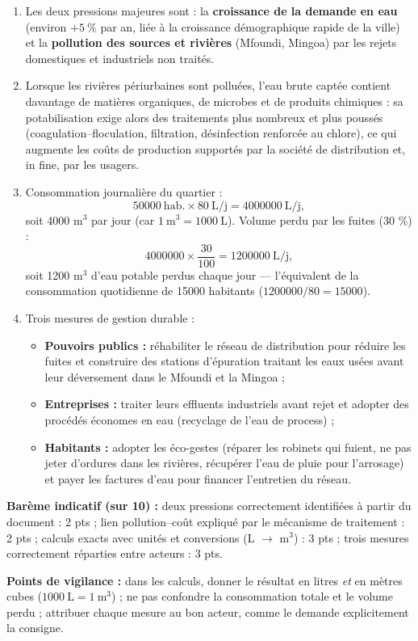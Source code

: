 \documentclass[11pt]{article}
\begin{document}
\begin{corrige}
\begin{enumerate}
\item Les deux pressions majeures sont : la \textbf{croissance de la demande en eau} (environ $+5\ \%$ par an, liée à la croissance démographique rapide de la ville) et la \textbf{pollution des sources et rivières} (Mfoundi, Mingoa) par les rejets domestiques et industriels non traités.
\item Lorsque les rivières périurbaines sont polluées, l'eau brute captée contient davantage de matières organiques, de microbes et de produits chimiques : sa potabilisation exige alors des traitements plus nombreux et plus poussés (coagulation--floculation, filtration, désinfection renforcée au chlore), ce qui augmente les coûts de production supportés par la société de distribution et, in fine, par les usagers.
\item Consommation journalière du quartier :
\[ \num{50000}\ \text{hab.} \times 80\ \text{L/j} = \num{4000000}\ \text{L/j}, \]
soit \num{4000} m$^3$ par jour (car $1\ \text{m}^3 = \num{1000}\ \text{L}$). Volume perdu par les fuites (30 \%) :
\[ \num{4000000} \times \frac{30}{100} = \num{1200000}\ \text{L/j}, \]
soit \num{1200} m$^3$ d'eau potable perdus chaque jour — l'équivalent de la consommation quotidienne de \num{15000} habitants ($\num{1200000}/80 = \num{15000}$).
\item Trois mesures de gestion durable :
\begin{itemize}
\item \textbf{Pouvoirs publics :} réhabiliter le réseau de distribution pour réduire les fuites et construire des stations d'épuration traitant les eaux usées avant leur déversement dans le Mfoundi et la Mingoa ;
\item \textbf{Entreprises :} traiter leurs effluents industriels avant rejet et adopter des procédés économes en eau (recyclage de l'eau de process) ;
\item \textbf{Habitants :} adopter les éco-gestes (réparer les robinets qui fuient, ne pas jeter d'ordures dans les rivières, récupérer l'eau de pluie pour l'arrosage) et payer les factures d'eau pour financer l'entretien du réseau.
\end{itemize}
\end{enumerate}
\textbf{Barème indicatif (sur 10) :} deux pressions correctement identifiées à partir du document : 2 pts ; lien pollution--coût expliqué par le mécanisme de traitement : 2 pts ; calculs exacts avec unités et conversions (L $\rightarrow$ m$^3$) : 3 pts ; trois mesures correctement réparties entre acteurs : 3 pts.

\textbf{Points de vigilance :} dans les calculs, donner le résultat en litres \emph{et} en mètres cubes ($\num{1000}\ \text{L} = 1\ \text{m}^3$) ; ne pas confondre la consommation totale et le volume perdu ; attribuer chaque mesure au bon acteur, comme le demande explicitement la consigne.
\end{corrige}
\end{document}
